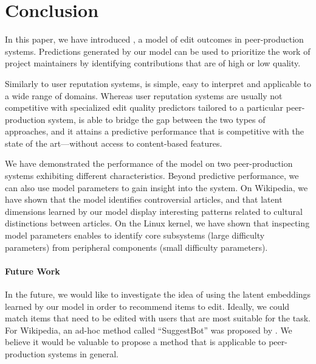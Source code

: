 \section{Conclusion}
\label{sec:conclusion}

In this paper, we have introduced \interank{}, a model of edit outcomes in peer-production systems.
Predictions generated by our model can be used to prioritize the work of project maintainers by identifying contributions that are of high or low quality.

Similarly to user reputation systems, \interank{} is simple, easy to interpret and applicable to a wide range of domains.
Whereas user reputation systems are usually not competitive with specialized edit quality predictors tailored to a particular peer-production system, \interank{} is able to bridge the gap between the two types of approaches, and it attains a predictive performance that is competitive with the state of the art---without access to content-based features.

We have demonstrated the performance of the model on two peer-production systems exhibiting different characteristics.
Beyond predictive performance, we can also use model parameters to gain insight into the system.
On Wikipedia, we have shown that the model identifies controversial articles, and that latent dimensions learned by our model display interesting patterns related to cultural distinctions between articles.
On the Linux kernel, we have shown that inspecting model parameters enables to identify core subsystems (large difficulty parameters) from peripheral components (small difficulty parameters).

\paragraph{Future Work}
In the future, we would like to investigate the idea of using the latent embeddings learned by our model in order to recommend items to edit.
Ideally, we could match items that need to be edited with users that are most suitable for the task.
For Wikipedia, an ad-hoc method called ``SuggestBot'' was proposed by \citet{cosley2007suggestbot}.
We believe it would be valuable to propose a method that is applicable to peer-production systems in general.

